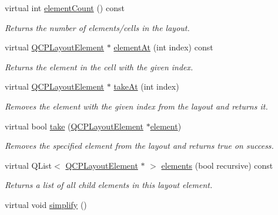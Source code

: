 \begin{DoxyCompactItemize}
\item 
virtual int \hyperlink{classQCPLayoutGrid_aa682b1d36660478f665bab3c64e956a9}{element\+Count} () const 
\begin{DoxyCompactList}\small\item\em Returns the number of elements/cells in the layout. \end{DoxyCompactList}\item 
virtual \hyperlink{classQCPLayoutElement}{Q\+C\+P\+Layout\+Element} $\ast$ \hyperlink{classQCPLayoutGrid_a26849ee5c47b4c940e8d65e8462f1065}{element\+At} (int index) const 
\begin{DoxyCompactList}\small\item\em Returns the element in the cell with the given {\itshape index}. \end{DoxyCompactList}\item 
virtual \hyperlink{classQCPLayoutElement}{Q\+C\+P\+Layout\+Element} $\ast$ \hyperlink{classQCPLayoutGrid_acc1277394ff8a6432e111ff9463e6375}{take\+At} (int index)
\begin{DoxyCompactList}\small\item\em Removes the element with the given {\itshape index} from the layout and returns it. \end{DoxyCompactList}\item 
virtual bool \hyperlink{classQCPLayoutGrid_a666a9fe9e92054436f9b66eba25cca0c}{take} (\hyperlink{classQCPLayoutElement}{Q\+C\+P\+Layout\+Element} $\ast$\hyperlink{classQCPLayoutGrid_a525f25e6ba43ee228151d074251b4e6a}{element})
\begin{DoxyCompactList}\small\item\em Removes the specified {\itshape element} from the layout and returns true on success. \end{DoxyCompactList}\item 
virtual Q\+List$<$ \hyperlink{classQCPLayoutElement}{Q\+C\+P\+Layout\+Element} $\ast$ $>$ \hyperlink{classQCPLayoutGrid_ae9e24e01552f6667b6d05b12a54a4caa}{elements} (bool recursive) const 
\begin{DoxyCompactList}\small\item\em Returns a list of all child elements in this layout element. \end{DoxyCompactList}\item 
\hypertarget{classQCPLayoutGrid_a08bba60e4acd20165526a8fd7f986b58}{}virtual void \hyperlink{classQCPLayoutGrid_a08bba60e4acd20165526a8fd7f986b58}{simplify} ()\label{classQCPLayoutGrid_a08bba60e4acd20165526a8fd7f986b58}


\end{DoxyCompactItemize}
